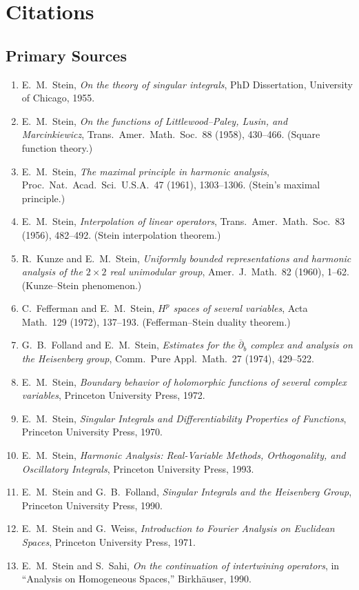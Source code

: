 \section{Citations}\subsection*{Primary Sources}
\begin{enumerate}
    \item E.\ M.\ Stein, \textit{On the theory of singular integrals}, PhD Dissertation, University of Chicago, 1955.
    \item E.\ M.\ Stein, \textit{On the functions of Littlewood--Paley, Lusin, and Marcinkiewicz}, Trans.\ Amer.\ Math.\ Soc.\ 88 (1958), 430--466. (Square function theory.)
    \item E.\ M.\ Stein, \textit{The maximal principle in harmonic analysis}, Proc.\ Nat.\ Acad.\ Sci.\ U.S.A.\ 47 (1961), 1303--1306. (Stein's maximal principle.)
    \item E.\ M.\ Stein, \textit{Interpolation of linear operators}, Trans.\ Amer.\ Math.\ Soc.\ 83 (1956), 482--492. (Stein interpolation theorem.)
    \item R.\ Kunze and E.\ M.\ Stein, \textit{Uniformly bounded representations and harmonic analysis of the \(2 \times 2\) real unimodular group}, Amer.\ J.\ Math.\ 82 (1960), 1--62. (Kunze--Stein phenomenon.)
    \item C.\ Fefferman and E.\ M.\ Stein, \textit{\(H^p\) spaces of several variables}, Acta Math.\ 129 (1972), 137--193. (Fefferman--Stein duality theorem.)
    \item G.\ B.\ Folland and E.\ M.\ Stein, \textit{Estimates for the \(\overline{\partial}_b\) complex and analysis on the Heisenberg group}, Comm.\ Pure Appl.\ Math.\ 27 (1974), 429--522.
    \item E.\ M.\ Stein, \textit{Boundary behavior of holomorphic functions of several complex variables}, Princeton University Press, 1972.
    \item E.\ M.\ Stein, \textit{Singular Integrals and Differentiability Properties of Functions}, Princeton University Press, 1970.
    \item E.\ M.\ Stein, \textit{Harmonic Analysis: Real-Variable Methods, Orthogonality, and Oscillatory Integrals}, Princeton University Press, 1993.
    \item E.\ M.\ Stein and G.\ B.\ Folland, \textit{Singular Integrals and the Heisenberg Group}, Princeton University Press, 1990.
    \item E.\ M.\ Stein and G.\ Weiss, \textit{Introduction to Fourier Analysis on Euclidean Spaces}, Princeton University Press, 1971.
    \item E.\ M.\ Stein and S.\ Sahi, \textit{On the continuation of intertwining operators}, in ``Analysis on Homogeneous Spaces,'' Birkh\"auser, 1990.
\end{enumerate}

